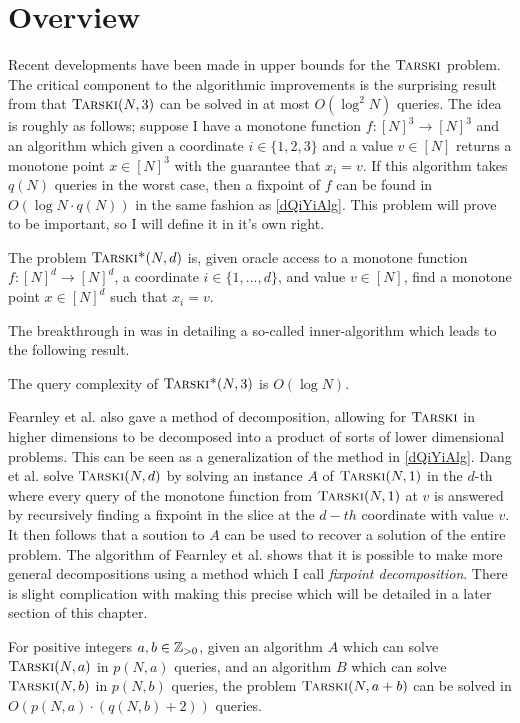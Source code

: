 \section{Overview}
Recent developments have been made in upper bounds for the $\textsc{Tarski}$ problem.
The critical component to the algorithmic improvements is
the surprising result from \citep{fasterTarski} that $\textsc{Tarski}(N, 3)$
can be solved in at most $O(\log^2 N)$ queries.
The idea is roughly as follows; suppose I have
a monotone function $f : [N]^3 \to [N]^3$ and an algorithm which
given a coordinate $i \in \{1, 2, 3\}$ and a value $v \in [N]$
returns a monotone point $x \in [N]^3$ with the guarantee
that $x_i = v$. If this algorithm takes $q(N)$ queries in the worst case,
then a fixpoint of $f$ can be found in $O(\log N \cdot q(N))$ in the
same fashion as \cref{dQiYiAlg}. This problem will prove to be
important, so I will define it in it's own right.
\newcommand{\trsks}{\textsc{Tarski*}}
\begin{definition}[\trsks]
  The problem $\trsks(N, d)$ is, given oracle access to a monotone function $f : [N]^d \to [N]^d$,
  a coordinate $i \in \{1, ..., d\}$, and value $v \in [N]$, find a monotone point $x \in [N]^d$ such that
  $x_i = v$. 
\end{definition}
The breakthrough in \citep{fasterTarski} was in detailing a so-called inner-algorithm which leads to
the following result.
\begin{theorem}
  The query complexity of $\trsks(N, 3)$ is $O(\log N)$.
\end{theorem}
Fearnley et al. also gave a method of decomposition, allowing for $\textsc{Tarski}$ in higher
dimensions to be decomposed into a product of sorts of lower
dimensional problems. This can be seen as a generalization of the method in \cref{dQiYiAlg}.
Dang et al. solve $\textsc{Tarski}(N, d)$ by solving an instance $A$ of $\textsc{Tarski}(N, 1)$ in the $d$-th 
where every query of the monotone function from $\textsc{Tarski}(N, 1)$ at $v$ is answered by recursively finding
a fixpoint in the slice at the $d-th$ coordinate with value $v$. It then follows that
a soution to $A$ can be used to recover a solution of the entire problem. The algorithm of
Fearnley et al. shows that it is possible to make more general decompositions using a method
which I call \emph{fixpoint decomposition}. There is slight complication with making this precise
which will be detailed in a later section of this chapter.
\begin{theorem}\label{fixDecomp}
  For positive integers $a, b \in \mathbb{Z}_{> 0}$, given an algorithm $A$
  which can solve $\textsc{Tarski}(N, a)$ in $p(N, a)$ queries, and an algorithm $B$
  which can solve $\textsc{Tarski}(N, b)$ in $p(N, b)$ queries, the problem
  $\textsc{Tarski}(N, a + b)$ can be solved in $O(p(N, a)\cdot (q(N, b) + 2))$ queries.
\end{theorem}
